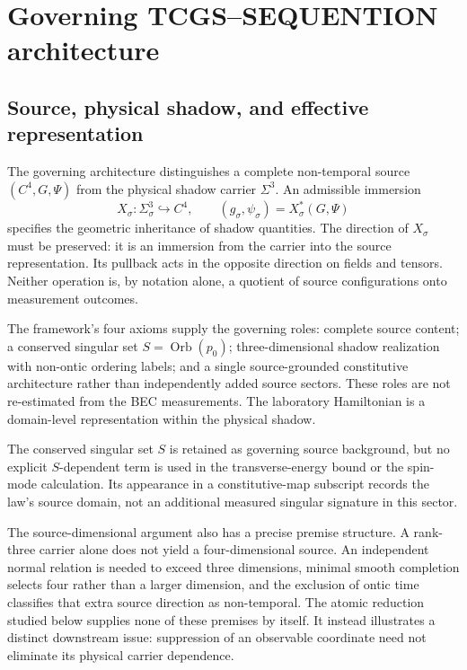 \documentclass[11pt,a4paper]{article}
\theoremstyle{definition}
\theoremstyle{remark}
\begin{document}
\section{Governing TCGS--SEQUENTION architecture}
\label{sec:framework}
\subsection{Source, physical shadow, and effective representation}
The governing architecture distinguishes a complete non-temporal source $(C^4,G,\Psi)$ from the physical shadow carrier $\Sigma^3$. An admissible immersion
\begin{equation}
 X_\sigma:\Sigma^3_\sigma\hookrightarrow C^4,
 \qquad (g_\sigma,\psi_\sigma)=X_\sigma^*(G,\Psi)
 \label{eq:pullback}
\end{equation}
specifies the geometric inheritance of shadow quantities. The direction of $X_\sigma$ must be preserved: it is an immersion from the carrier into the source representation. Its pullback acts in the opposite direction on fields and tensors. Neither operation is, by notation alone, a quotient of source configurations onto measurement outcomes.\cite{foundation}

The framework's four axioms supply the governing roles: complete source content; a conserved singular set $S=\operatorname{Orb}(p_0)$; three-dimensional shadow realization with non-ontic ordering labels; and a single source-grounded constitutive architecture rather than independently added source sectors. These roles are not re-estimated from the BEC measurements. The laboratory Hamiltonian is a domain-level representation within the physical shadow.\cite{foundation,logical}

The conserved singular set $S$ is retained as governing source background, but no explicit $S$-dependent term is used in the transverse-energy bound or the spin-mode calculation. Its appearance in a constitutive-map subscript records the law's source domain, not an additional measured singular signature in this sector.\cite{foundation}

The source-dimensional argument also has a precise premise structure. A rank-three carrier alone does not yield a four-dimensional source. An independent normal relation is needed to exceed three dimensions, minimal smooth completion selects four rather than a larger dimension, and the exclusion of ontic time classifies that extra source direction as non-temporal. The atomic reduction studied below supplies none of these premises by itself. It instead illustrates a distinct downstream issue: suppression of an observable coordinate need not eliminate its physical carrier dependence.\cite{logical,planck}
\end{document}
